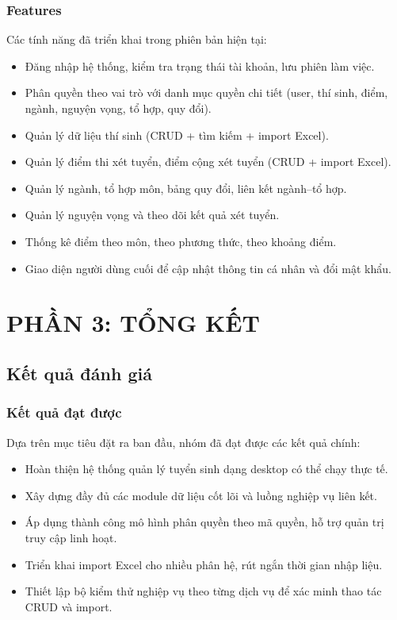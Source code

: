 \documentclass[12pt,a4paper,oneside]{report}
\begin{document}
\section{Features}
Các tính năng đã triển khai trong phiên bản hiện tại:
\begin{itemize}
  \item Đăng nhập hệ thống, kiểm tra trạng thái tài khoản, lưu phiên làm việc.
  \item Phân quyền theo vai trò với danh mục quyền chi tiết (user, thí sinh, điểm, ngành, nguyện vọng, tổ hợp, quy đổi).
  \item Quản lý dữ liệu thí sinh (CRUD + tìm kiếm + import Excel).
  \item Quản lý điểm thi xét tuyển, điểm cộng xét tuyển (CRUD + import Excel).
  \item Quản lý ngành, tổ hợp môn, bảng quy đổi, liên kết ngành--tổ hợp.
  \item Quản lý nguyện vọng và theo dõi kết quả xét tuyển.
  \item Thống kê điểm theo môn, theo phương thức, theo khoảng điểm.
  \item Giao diện người dùng cuối để cập nhật thông tin cá nhân và đổi mật khẩu.
\end{itemize}

\part*{PHẦN 3: TỔNG KẾT}

\chapter{Kết quả đánh giá}
\section{Kết quả đạt được}
Dựa trên mục tiêu đặt ra ban đầu, nhóm đã đạt được các kết quả chính:
\begin{itemize}
  \item Hoàn thiện hệ thống quản lý tuyển sinh dạng desktop có thể chạy thực tế.
  \item Xây dựng đầy đủ các module dữ liệu cốt lõi và luồng nghiệp vụ liên kết.
  \item Áp dụng thành công mô hình phân quyền theo mã quyền, hỗ trợ quản trị truy cập linh hoạt.
  \item Triển khai import Excel cho nhiều phân hệ, rút ngắn thời gian nhập liệu.
  \item Thiết lập bộ kiểm thử nghiệp vụ theo từng dịch vụ để xác minh thao tác CRUD và import.
\end{itemize}
\end{document}
